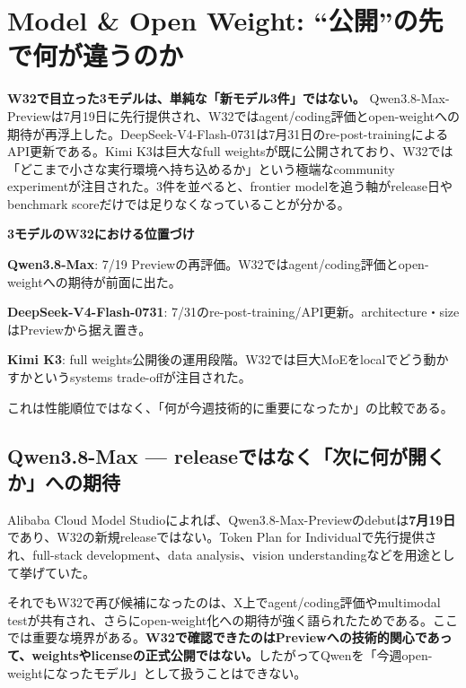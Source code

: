 \section{Model \& Open Weight: ``公開''の先で何が違うのか}

\textbf{W32で目立った3モデルは、単純な「新モデル3件」ではない。}
Qwen3.8-Max-Previewは7月19日に先行提供され、W32ではagent/coding評価とopen-weightへの期待が再浮上した。DeepSeek-V4-Flash-0731は7月31日のre-post-trainingによるAPI更新である。Kimi K3は巨大なfull weightsが既に公開されており、W32では「どこまで小さな実行環境へ持ち込めるか」という極端なcommunity experimentが注目された\cite{qwen38-token-plan,deepseek-v4-flash-0731,kimi-k3-hf,kimi-k3-x-lowram}。3件を並べると、frontier modelを追う軸がrelease日やbenchmark scoreだけでは足りなくなっていることが分かる。

\begin{tcolorbox}[enhanced,breakable,colback=SurveySoft,colframe=SurveyRule,boxrule=0.4pt,arc=1mm,left=2mm,right=2mm,top=1.5mm,bottom=1.5mm]
\textbf{3モデルのW32における位置づけ}\par\smallskip
\textbf{Qwen3.8-Max}: 7/19 Previewの再評価。W32ではagent/coding評価とopen-weightへの期待が前面に出た。\par
\textbf{DeepSeek-V4-Flash-0731}: 7/31のre-post-training/API更新。architecture・sizeはPreviewから据え置き。\par
\textbf{Kimi K3}: full weights公開後の運用段階。W32では巨大MoEをlocalでどう動かすかというsystems trade-offが注目された。\par\smallskip
\footnotesize これは性能順位ではなく、「何が今週技術的に重要になったか」の比較である。
\end{tcolorbox}

\subsection*{Qwen3.8-Max --- releaseではなく「次に何が開くか」への期待}

Alibaba Cloud Model Studioによれば、Qwen3.8-Max-Previewのdebutは\textbf{7月19日}であり、W32の新規releaseではない。Token Plan for Individualで先行提供され、full-stack development、data analysis、vision understandingなどを用途として挙げていた\cite{qwen38-token-plan}。

それでもW32で再び候補になったのは、X上でagent/coding評価やmultimodal testが共有され、さらにopen-weight化への期待が強く語られたためである。ここでは重要な境界がある。\textbf{W32で確認できたのはPreviewへの技術的関心であって、weightsやlicenseの正式公開ではない。}したがってQwenを「今週open-weightになったモデル」として扱うことはできない。

